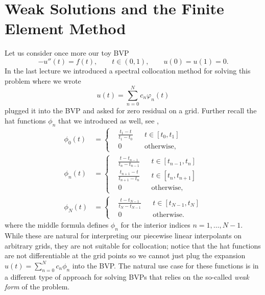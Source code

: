 \chapter{Weak Solutions and the Finite Element Method}

Let us consider once more our toy BVP 
\begin{equation}\label{eq:l20:toy-BVP}
    - u''(t) = f(t), \qquad t \in (0,1), \qquad u(0) = u(1) = 0.
\end{equation}
In the last lecture we introduced a spectral collocation 
method for solving this problem where we 
wrote 
\begin{equation*}
    u(t) = \sum_{n=0}^N c_n \varphi_n(t)
\end{equation*}
plugged it into the BVP and asked for zero residual on a grid. 
Further recall the hat functions $\phi_n$ that we 
introduced as well, see , 
\begin{equation*}
\begin{aligned}
    \phi_0(t) &= \left\{
        \begin{aligned}
            & \frac{t_1 - t}{t_1 - t_0} && t \in[t_0, t_1] \\ 
            & 0 && \text{otherwise}, 
        \end{aligned}
    \right. \\
    \phi_{n}(t)& = \left\{
         \begin{aligned}
            & \frac{t - t_{n-1}}{t_n - t_{n-1}} && t \in[t_{n-1}, t_n] \\
            & \frac{t_{n+1} - t}{t_{n+1} - t_n} && t \in[t_n, t_{n+1}] \\ 
            & 0 && \text{otherwise}, 
        \end{aligned}
    \right. \\
    \phi_N(t) &= \left\{
        \begin{aligned}
            & \frac{t - t_{N-1}}{t_N - t_{N-1}} && t \in[t_{N-1}, t_N] \\ 
            & 0 && \text{otherwise}.
        \end{aligned}
    \right.
\end{aligned}
\end{equation*}
where the middle formula defines $\phi_n$ for the interior indices 
$n = 1, \dots, N-1$. While these are natural for interpreting our piecewise linear 
interpolants on arbitrary grids, they are not suitable for 
collocation; notice that the hat functions are not differentiable 
at the grid points so we cannot just plug the expansion 
$u(t) = \sum_{n=0}^N c_n \phi_n$ into the BVP. The natural 
use case for these functions is in a different type of approach 
for solving BVPs that relies on the so-called {\it weak form}
of the problem. 

